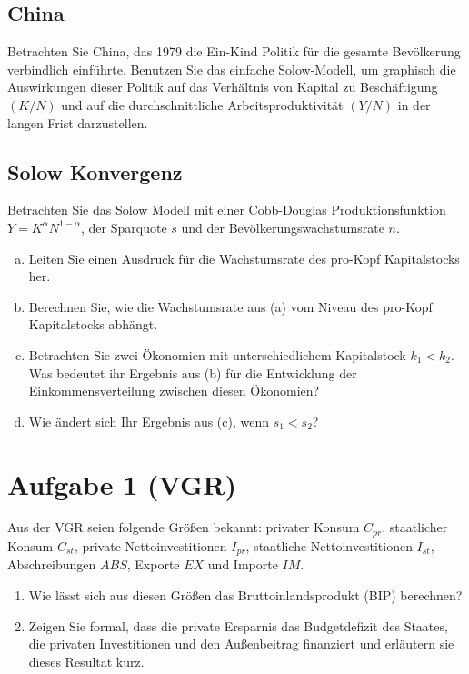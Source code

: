 \documentclass{scrartcl}
\begin{document}
\subsection{China}
Betrachten Sie China, das 1979 die Ein-Kind Politik für die gesamte Bevölkerung verbindlich einführte. Benutzen Sie das einfache Solow-Modell, um graphisch die Auswirkungen dieser Politik auf das Verhältnis von Kapital zu Beschäftigung $(K/N)$ und auf die durchschnittliche Arbeitsproduktivität $(Y/N)$ in der langen Frist darzustellen.

\subsection{Solow Konvergenz}
Betrachten Sie das Solow Modell mit einer Cobb-Douglas Produktionsfunktion $Y=K^{\alpha}N^{1-\alpha}$, der Sparquote $s$ und der Bevölkerungswachstumsrate $n$.
\begin{enumerate}[(a)]
  \item Leiten Sie einen Ausdruck für die Wachstumsrate des pro-Kopf Kapitalstocks her.
  \item Berechnen Sie, wie die Wachstumsrate aus (a) vom Niveau des pro-Kopf Kapitalstocks abhängt.
  \item Betrachten Sie zwei Ökonomien mit unterschiedlichem Kapitalstock $k_1<k_2$. Was bedeutet ihr Ergebnis aus (b) für die Entwicklung der Einkommensverteilung zwischen diesen Ökonomien?
  \item Wie ändert sich Ihr Ergebnis aus (c), wenn $s_1<s_2$?
\end{enumerate}


\section*{Aufgabe 1 (VGR)}
Aus der VGR seien folgende Gr\"{o}{\ss}en bekannt: privater Konsum $C_{pr}$, staatlicher Konsum $C_{st}$, private Nettoinvestitionen $I_{pr}$, staatliche Nettoinvestitionen $I_{st}$, Abschreibungen $ABS$, Exporte $EX$ und Importe $IM$.
\begin{enumerate}
	\item Wie l\"{a}sst sich aus diesen Gr\"{o}{\ss}en das Bruttoinlandsprodukt (BIP) berechnen?
	\item Zeigen Sie formal, dass die private Ersparnis das Budgetdefizit des Staates, die privaten Investitionen und den Au{\ss}enbeitrag finanziert und erl\"{a}utern sie dieses Resultat kurz.
\end{enumerate}
\end{document}
